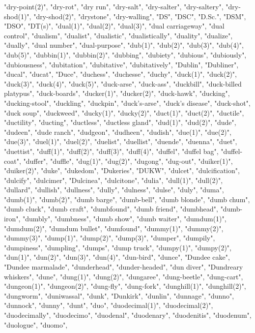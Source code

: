 "dry-point(2)",
"dry-rot",
"dry run",
"dry-salt",
"dry-salter",
"dry-saltery",
"dry-shod(1)",
"dry-shod(2)",
"drystone",
"dry-walling",
"DS",
"DSC",
"D.Sc.",
"DSM",
"DSO",
"DT(s)",
"dual(1)",
"dual(2)",
"dual(3)",
"dual carriageway",
"dual control",
"dualism",
"dualist",
"dualistic",
"dualistically",
"duality",
"dualize",
"dually",
"dual number",
"dual-purpose",
"dub(1)",
"dub(2)",
"dub(3)",
"dub(4)",
"dub(5)",
"dubbin(1)",
"dubbin(2)",
"dubbing",
"dubiety",
"dubious",
"dubiously",
"dubiousness",
"dubitation",
"dubitative",
"dubitatively",
"Dublin",
"Dubliner",
"ducal",
"ducat",
"Duce",
"duchess",
"duchesse",
"duchy",
"duck(1)",
"duck(2)",
"duck(3)",
"duck(4)",
"duck(5)",
"duck-arse",
"duck-ass",
"duckbill",
"duck-billed platypus",
"duck-boards",
"ducker(1)",
"ducker(2)",
"duck-hawk",
"ducking",
"ducking-stool",
"duckling",
"duckpin",
"duck's-arse",
"duck's disease",
"duck-shot",
"duck soup",
"duckweed",
"ducky(1)",
"ducky(2)",
"duct(1)",
"duct(2)",
"ductile",
"ductility",
"ducting",
"ductless",
"ductless gland",
"dud(1)",
"dud(2)",
"dude",
"dudeen",
"dude ranch",
"dudgeon",
"dudheen",
"dudish",
"due(1)",
"due(2)",
"due(3)",
"duel(1)",
"duel(2)",
"duelist",
"duellist",
"duende",
"duenna",
"duet",
"duettist",
"duff(1)",
"duff(2)",
"duff(3)",
"duff(4)",
"duffel",
"duffel bag",
"duffel-coat",
"duffer",
"duffle",
"dug(1)",
"dug(2)",
"dugong",
"dug-out",
"duiker(1)",
"duiker(2)",
"duke",
"dukedom",
"Dukeries",
"DUKW",
"dulcet",
"dulcification",
"dulcify",
"dulcimer",
"Dulcinea",
"dulcitone",
"dulia",
"dull(1)",
"dull(2)",
"dullard",
"dullish",
"dullness",
"dully",
"dulness",
"dulse",
"duly",
"duma",
"dumb(1)",
"dumb(2)",
"dumb barge",
"dumb-bell",
"dumb blonde",
"dumb chum",
"dumb cluck",
"dumb craft",
"dumbfound",
"dumb friend",
"dumbhead",
"dumb-iron",
"dumbly",
"dumbness",
"dumb show",
"dumb waiter",
"dumdum(1)",
"dumdum(2)",
"dumdum bullet",
"dumfound",
"dummy(1)",
"dummy(2)",
"dummy(3)",
"dump(1)",
"dump(2)",
"dump(3)",
"dumper",
"dumpily",
"dumpiness",
"dumpling",
"dumps",
"dump truck",
"dumpy(1)",
"dumpy(2)",
"dun(1)",
"dun(2)",
"dun(3)",
"dun(4)",
"dun-bird",
"dunce",
"Dundee cake",
"Dundee marmalade",
"dunderhead",
"dunder-headed",
"dun diver",
"Dundreary whiskers",
"dune",
"dung(1)",
"dung(2)",
"dungaree",
"dung-beetle",
"dung-cart",
"dungeon(1)",
"dungeon(2)",
"dung-fly",
"dung-fork",
"dunghill(1)",
"dunghill(2)",
"dungworm",
"duniwassal",
"dunk",
"Dunkirk",
"dunlin",
"dunnage",
"dunno",
"dunnock",
"dunny",
"dunt",
"duo",
"duodecimal(1)",
"duodecimal(2)",
"duodecimally",
"duodecimo",
"duodenal",
"duodenary",
"duodenitis",
"duodenum",
"duologue",
"duomo",
